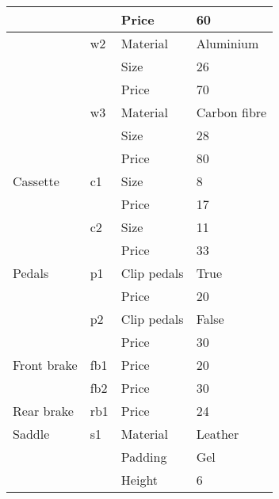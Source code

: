 \begin{longtable}[c]{|l|l|l|l|}
                       &                & Price          & 60              \\ \hline
                       & w2             & Material       & Aluminium       \\ \hline
                       &                & Size           & 26              \\ \hline
                       &                & Price          & 70              \\ \hline
                       & w3             & Material       & Carbon fibre    \\ \hline
                       &                & Size           & 28              \\ \hline
                       &                & Price          & 80              \\ \hline
Cassette               & c1             & Size           & 8               \\ \hline
                       &                & Price          & 17              \\ \hline
                       & c2             & Size           & 11              \\ \hline
                       &                & Price          & 33              \\ \hline
Pedals                 & p1             & Clip pedals    & True            \\ \hline
                       &                & Price          & 20              \\ \hline
                       & p2             & Clip pedals    & False           \\ \hline
                       &                & Price          & 30              \\ \hline
Front brake            & fb1            & Price          & 20              \\ \hline
                       & fb2            & Price          & 30              \\ \hline
Rear brake             & rb1            & Price          & 24              \\ \hline
Saddle                 & s1             & Material       & Leather         \\ \hline
                       &                & Padding        & Gel             \\ \hline
                       &                & Height         & 6               \\ \hline

\end{longtable}

